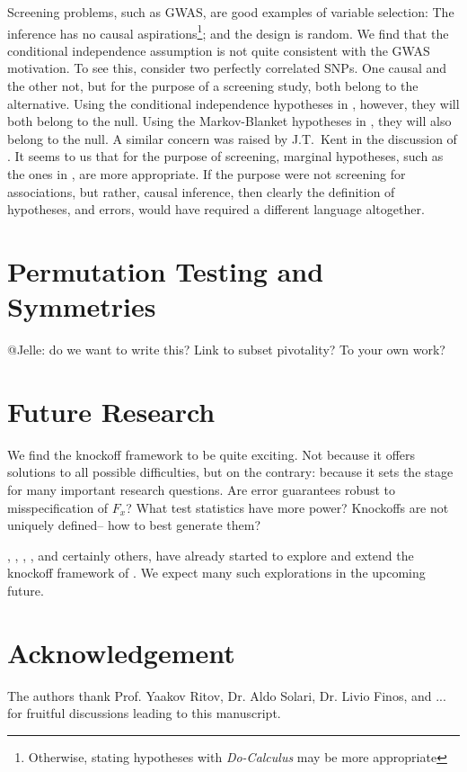 \documentclass[article,lineno]{biometrika}
\begin{document}
Screening problems, such as GWAS, are good examples of variable selection:
The inference has no causal aspirations\footnote{Otherwise, stating hypotheses with \emph{Do-Calculus} \citep{pearl1995causal} may be more appropriate};
and the design is random.
We find that the conditional independence assumption is not quite consistent with the GWAS motivation. 
To see this, consider two perfectly correlated SNPs. 
One causal and the other not, but for the purpose of a screening study, both belong to the alternative. 
Using the conditional independence hypotheses in \cite{SesiaGenehuntinghidden}, however, they will both belong to the null. 
Using the Markov-Blanket hypotheses in \cite{CandesPanninggoldmodelX2018}, they will also belong to the null. 
A similar concern was raised by J.T.\ Kent in the discussion of \cite{MeinshausenStabilityselection2010}. 
It seems to us that for the purpose of screening, marginal hypotheses, such as the ones in \cite{TusherSignificanceanalysismicroarrays2001}, are more appropriate. 
If the purpose were not screening for associations, but rather, causal inference, then clearly the definition of hypotheses, and errors, would have required a different language altogether. 




\section{Permutation Testing and Symmetries}
@Jelle: do we want to write this? 
Link to subset pivotality? 
To your own work?



\section{Future Research}

We find the knockoff framework to be quite exciting. 
Not because it offers solutions to all possible difficulties, but on the contrary: because it sets the stage for many important research questions.
Are error guarantees robust to misspecification of $F_x$?
What test statistics have more power?
Knockoffs are not uniquely defined-- how to best generate them?

\cite{DaiknockofffilterFDR2016}, \cite{JansonFamilywiseerrorrate2016}, \cite{ChenAnalysisKnockoffFilter2017}, \cite{ChenPseudoKnockoffFilter2017}, and certainly others, have already started to explore and extend the knockoff framework of \cite{BarberControllingfalsediscovery2015}. 
We expect many such explorations in the upcoming future. 



\section*{Acknowledgement}
The authors thank Prof. Yaakov Ritov, Dr. Aldo Solari, Dr. Livio Finos, and ... for fruitful discussions leading to this manuscript. 






\end{document}
